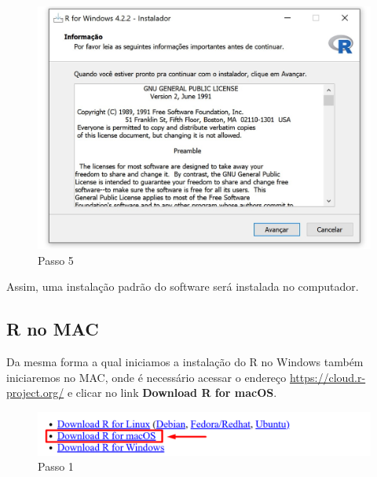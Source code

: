\documentclass[
  letterpaper,
  DIV=11,
  numbers=noendperiod]{scrreprt}
\begin{document}
\begin{figure}

{\centering \includegraphics[width=1\textwidth,height=\textheight]{./figuras_tutorialR/install_Windows4.jpg}

}

\caption{Passo 5}

\end{figure}

Assim, uma instalação padrão do software será instalada no computador.

\hypertarget{r-no-mac}{%
\subsection{R no MAC}\label{r-no-mac}}

Da mesma forma a qual iniciamos a instalação do R no Windows também
iniciaremos no MAC, onde é necessário acessar o endereço
\url{https://cloud.r-project.org/} e clicar no link \textbf{Download R
for macOS}.

\begin{figure}

{\centering \includegraphics[width=1\textwidth,height=\textheight]{./figuras_tutorialR/mac_R_1.png}

}

\caption{Passo 1}

\end{figure}
\end{document}
